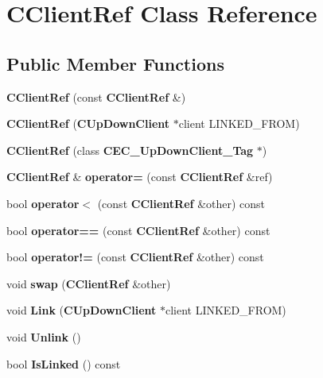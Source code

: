 \section{CClientRef Class Reference}
\label{classCClientRef}
\subsection*{Public Member Functions}
\begin{DoxyCompactItemize}
\item 
{\bfseries CClientRef} (const {\bf CClientRef} \&)\label{classCClientRef_a9eb242c44909debd76132a70f7e9fd59}

\item 
{\bfseries CClientRef} ({\bf CUpDownClient} $\ast$client LINKED\_\-FROM)\label{classCClientRef_a68496cf930bd2eef7ca845653dab4181}

\item 
{\bfseries CClientRef} (class {\bf CEC\_\-UpDownClient\_\-Tag} $\ast$)\label{classCClientRef_a25692213727c4c4801896158c59eef37}

\item 
{\bf CClientRef} \& {\bfseries operator=} (const {\bf CClientRef} \&ref)\label{classCClientRef_a121e06988be31a2c4f47e4d22a25d820}

\item 
bool {\bfseries operator$<$} (const {\bf CClientRef} \&other) const \label{classCClientRef_ad363722196cd8b57ff9b5b9652eea6e5}

\item 
bool {\bfseries operator==} (const {\bf CClientRef} \&other) const \label{classCClientRef_a0e14d69ee28a31deeed0c45d748b340c}

\item 
bool {\bfseries operator!=} (const {\bf CClientRef} \&other) const \label{classCClientRef_ade11a974d7078ba3423c5bf148e32688}

\item 
void {\bfseries swap} ({\bf CClientRef} \&other)\label{classCClientRef_a9ee06e67054f357d79047952069781eb}

\item 
void {\bfseries Link} ({\bf CUpDownClient} $\ast$client LINKED\_\-FROM)\label{classCClientRef_a1122bef6662dbc37a1fbc7e71b8c151e}

\item 
void {\bfseries Unlink} ()\label{classCClientRef_ab04b70de963449d1fe9a6946b3f51f29}

\item 
bool {\bfseries IsLinked} () const \label{classCClientRef_a159f901a99d853bc2da7d3a1d80c1b5f}


\end{DoxyCompactItemize}
